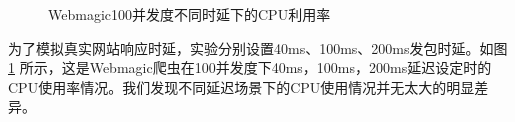 \documentclass[master]{njuthesis}
\begin{document}
\begin{figure}[!htbp]
\centering
{}
  
  \hfill
\caption{Webmagic100并发度不同时延下的CPU利用率}\label{40ms}
\end{figure}

为了模拟真实网站响应时延，实验分别设置40ms、100ms、200ms发包时延。如图\ref{40ms} 所示，这是Webmagic爬虫在100并发度下40ms，100ms，200ms延迟设定时的CPU使用率情况。我们发现不同延迟场景下的CPU使用情况并无太大的明显差异。
\end{document}
